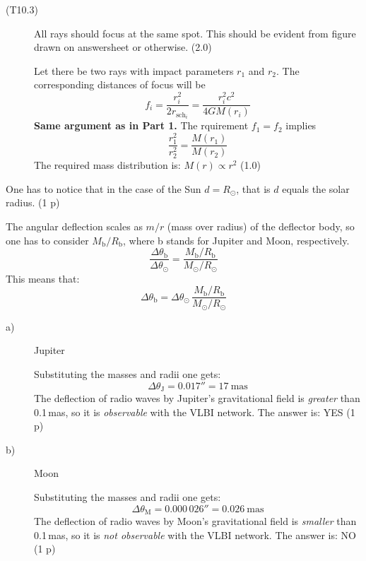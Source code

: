 \begin{description}
\item[(T10.3)]
All rays should focus at the same spot. This should be evident from figure
drawn on answersheet or otherwise. \hfill(2.0)

Let there be two rays with impact parameters $r_1$ and $r_2$. The
corresponding distances of focus will be
\[
f_i = \frac{r_i^2}{2r_{\mathrm{sch}_i}} = \frac{r_i^2 c^2}{4GM(r_i)} \tag*{(2.0)}
\]
\textbf{Same argument as in Part 1.} The rquirement %
$f_1 = f_2$ implies
\[
\frac{r_1^2}{r_2^2} = \frac{M(r_1)}{M(r_2)} \tag*{(1.0)}
\]
The required mass distribution is: $\boxed{M(r) \propto r^2}$ \hfill(1.0)
\end{description}

One has to notice that in the case of the Sun $d = R_\odot$, that is $d$
equals the solar radius. \hfill(1 p)

The angular deflection scales as $m/r$ (mass over radius) of the deflector
body, so one has to consider $M_{\mathrm{b}}/R_{\mathrm{b}}$, where b stands
for Jupiter and Moon, respectively.
\[
\frac{\Delta\theta_{\mathrm{b}}}{\Delta\theta_\odot}
  = \frac{M_{\mathrm{b}}/R_{\mathrm{b}}}{M_\odot/R_\odot}
  \tag*{(2.1)\quad(2 p)}
\]
This means that:
\[
\Delta\theta_{\mathrm{b}}
  = \Delta\theta_\odot\,\frac{M_{\mathrm{b}}/R_{\mathrm{b}}}{M_\odot/R_\odot}
  \tag*{(2.2)\quad(1 p)}
\]
\begin{description}
\item[a)] Jupiter

Substituting the masses and radii one gets:
\[
\Delta\theta_{\mathrm{J}} = \boxed{0.017''} = \boxed{17~\mathrm{mas}}
  \tag*{(2 p)}
\]
The deflection of radio waves by Jupiter's gravitational field is
\emph{greater} than 0.1\,mas, so it is \emph{observable} with the VLBI
network. The answer is: YES \hfill(1 p)

\item[b)] Moon

Substituting the masses and radii one gets:
\[
\Delta\theta_{\mathrm{M}} = \boxed{0.000\,026''} = \boxed{0.026~\mathrm{mas}}
  \tag*{(2 p)}
\]
The deflection of radio waves by Moon's gravitational field is \emph{smaller}
than 0.1\,mas, so it is \emph{not observable} with the VLBI network. The
answer is: NO \hfill(1 p)
\end{description}

